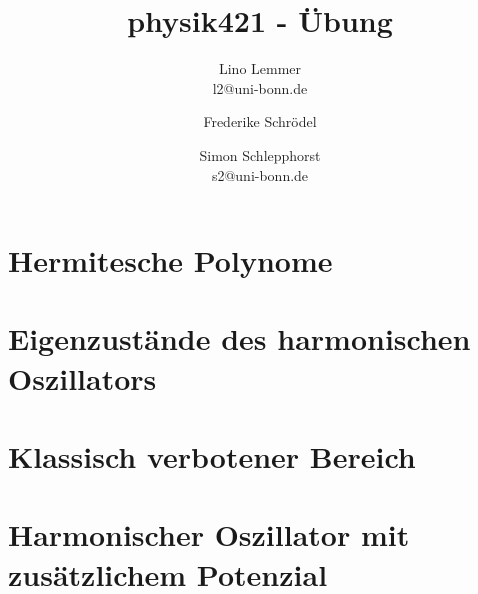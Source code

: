 

\setcounter{thezettel}{4}
\renewcommand\thesection{\arabic{thezettel}.\arabic{section}}


\title{physik421 - Übung }
\author{Lino Lemmer \\ \small{l2@uni-bonn.de} \and Frederike Schrödel \and Simon Schlepphorst\\ \small{s2@uni-bonn.de}}


\maketitle

\section{Hermitesche Polynome}


\section{Eigenzustände des harmonischen Oszillators}


\section{Klassisch verbotener Bereich}


\section{Harmonischer Oszillator mit zusätzlichem Potenzial}



